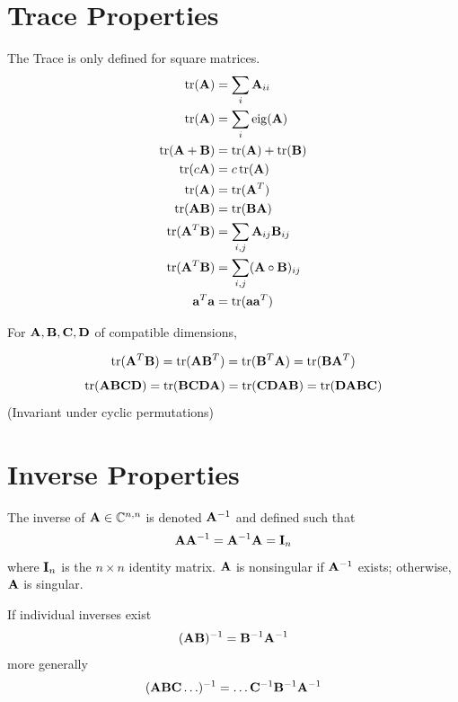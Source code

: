 \section{Trace Properties}
The Trace is only defined for square matrices.
\begin{align}
\trace(\mA)      &=\sum_i \mA_{ii}               \\
\trace(\mA)      &=\sum_i \eig(\mA)              \\
\trace(\mA+\mB)  &=\trace(\mA)+\trace(\mB)       \\
\trace(c\mA)     &=c\trace(\mA)                  \\
\trace(\mA)      &=\trace(\mA^T)                 \\
\trace(\mA\mB)   &=\trace(\mB\mA)                \\
\trace(\mA^T\mB) &=\sum_{i,j} \mA_{ij}\mB_{ij}   \\  %
\trace(\mA^T\mB) &=\sum_{i,j} (\mA\circ\mB)_{ij} \\  %
\va^T \va        &=\trace(\va \va^T)
\end{align}

For $\mathbf{A},\mathbf{B},\mathbf{C},\mathbf{D}$ of compatible dimensions,

\begin{equation}
\operatorname{tr}(\mathbf{A}^T\mathbf{B})=\operatorname{tr}(\mathbf{A}\mathbf{B}^T)=\operatorname{tr}(\mathbf{B}^T\mathbf{A})=\operatorname{tr}(\mathbf{B}\mathbf{A}^T)
\end{equation}
\begin{equation}
\operatorname{tr}(\mathbf{A}\mathbf{B}\mathbf{C}\mathbf{D})=\operatorname{tr}(\mathbf{B}\mathbf{C}\mathbf{D}\mathbf{A})=\operatorname{tr}(\mathbf{C}\mathbf{D}\mathbf{A}\mathbf{B})=\operatorname{tr}(\mathbf{D}\mathbf{A}\mathbf{B}\mathbf{C})
\end{equation}
(Invariant under cyclic permutations)



\section{Inverse Properties}
The inverse of $\mathbf{A}\in\mathbb{C}^{n,n}$ is denoted $\mathbf{A}^{-1}$ and defined such that
\begin{equation}
\mathbf{A}\mathbf{A}^{-1}=\mathbf{A}^{-1}\mathbf{A}=\mathbf{I}_n
\end{equation}
where $\mathbf{I}_n$ is the $n \times n$ identity matrix. $\mathbf{A}$ is nonsingular if $\mathbf{A}^{-1}$ exists; otherwise, $\mathbf{A}$ is singular.


If individual inverses exist
\begin{equation}
(\mathbf{A}\mathbf{B})^{-1}=\mathbf{B}^{-1}\mathbf{A}^{-1}
\end{equation}
more generally
\begin{equation}
(\mathbf{A}\mathbf{B}\mathbf{C}\ldots)^{-1}=\ldots\mathbf{C}^{-1}\mathbf{B}^{-1}\mathbf{A}^{-1}
\end{equation}


